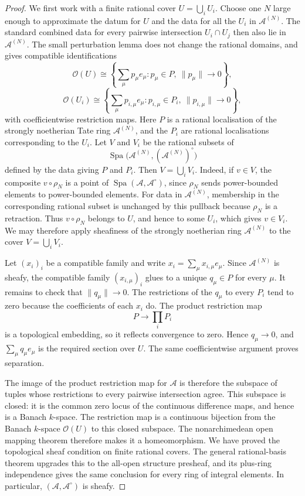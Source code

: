 \documentclass[11pt,reqno]{amsart}
\theoremstyle{definition}
\newcommand{\Spa}{\operatorname{Spa}}
\begin{document}
\begin{proof}
We first work with a finite rational cover $U=\bigcup_iU_i$.  Choose one
$N$ large enough to approximate the datum for $U$ and the data for all the
$U_i$ in $\mathcal A^{(N)}$.  The standard combined data for every pairwise
intersection $U_i\cap U_j$ then also lie in $\mathcal A^{(N)}$.  The small
perturbation lemma does not change the rational domains, and
 gives
compatible identifications
\[
  \mathcal O(U)\cong
  \left\{\sum_\mu p_\mu e_\mu:
    p_\mu\in P,\ \lVert p_\mu\rVert\to0\right\},
\]
\[
  \mathcal O(U_i)\cong
  \left\{\sum_\mu p_{i,\mu}e_\mu:
    p_{i,\mu}\in P_i,\ \lVert p_{i,\mu}\rVert\to0\right\},
\]
with coefficientwise restriction maps.  Here $P$ is a rational localisation
of the strongly noetherian Tate ring $\mathcal A^{(N)}$, and the $P_i$ are
rational localisations corresponding to the $U_i$.  Let $V$ and $V_i$ be
the rational subsets of
\[
  \Spa\bigl(\mathcal A^{(N)},(\mathcal A^{(N)})^\circ\bigr)
\]
defined by the data giving $P$ and $P_i$.  Then $V=\bigcup_iV_i$.  Indeed,
if $v\in V$, the composite $v\circ\rho_N$ is a point of
$\Spa(\mathcal A,\mathcal A^\circ)$, since $\rho_N$ sends power-bounded
elements to power-bounded elements.  For data in $\mathcal A^{(N)}$,
membership in the corresponding rational subset is unchanged by this
pullback because $\rho_N$ is a retraction.  Thus $v\circ\rho_N$ belongs to
$U$, and hence to some $U_i$, which gives $v\in V_i$.  We may therefore
apply sheafiness of the strongly noetherian ring $\mathcal A^{(N)}$ to the
cover $V=\bigcup_iV_i$.

Let $(x_i)_i$ be a compatible family and write
$x_i=\sum_\mu x_{i,\mu}e_\mu$.  Since $\mathcal A^{(N)}$ is sheafy,
the compatible family $(x_{i,\mu})_i$ glues to a unique $q_\mu\in P$ for every
$\mu$.  It remains to check that $\lVert q_\mu\rVert\to0$.  The restrictions
of the $q_\mu$ to every $P_i$ tend to zero because the coefficients of each
$x_i$ do.  The product restriction map
\[
  P\longrightarrow\prod_iP_i
\]
is a topological embedding, so it reflects convergence to zero.  Hence
$q_\mu\to0$, and $\sum_\mu q_\mu e_\mu$ is the required section over $U$.
The same coefficientwise argument proves separation.

The image of the product restriction map for $\mathcal A$ is therefore the
subspace of tuples whose restrictions to every pairwise intersection agree.
This subspace is closed: it is the common zero locus of the continuous
difference maps, and hence is a Banach $k$-space.  The restriction map is a
continuous bijection from the Banach $k$-space $\mathcal O(U)$ to this
closed subspace.  The nonarchimedean open mapping theorem therefore makes it
a homeomorphism.  We have proved the topological sheaf condition on finite
rational covers.  The
general rational-basis theorem upgrades this to the all-open structure
presheaf, and its plus-ring independence gives the same conclusion for every
ring of integral elements.  In particular, $(\mathcal A,\mathcal A^\circ)$
is sheafy.


\end{proof}
\end{document}
